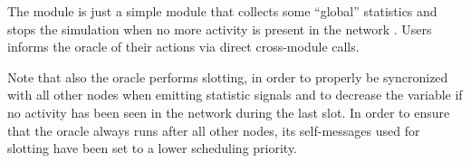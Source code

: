 The  module is just a simple module that collects some ``global''
statistics and stops the simulation when no more activity is present in the
network . Users informs the oracle of
their actions via direct cross-module calls.

Note that also the oracle performs slotting, in order to properly be syncronized
with all other nodes when emitting statistic signals and to decrease the
 variable if no activity has been seen in the network during the
last slot. In order to ensure that the oracle always runs after all other nodes,
its self-messages used for slotting have been set to a lower scheduling
priority.

